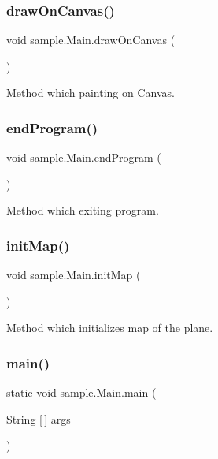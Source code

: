 \subsubsection{\texorpdfstring{draw\+On\+Canvas()}{drawOnCanvas()}}
{\footnotesize\ttfamily void sample.\+Main.\+draw\+On\+Canvas (\begin{DoxyParamCaption}{ }\end{DoxyParamCaption})}

Method which painting on Canvas. \mbox{\label{classsample_1_1_main_afb2b026a5f80dedc650f7edca34200bb}} 
\subsubsection{\texorpdfstring{end\+Program()}{endProgram()}}
{\footnotesize\ttfamily void sample.\+Main.\+end\+Program (\begin{DoxyParamCaption}{ }\end{DoxyParamCaption})}

Method which exiting program. \mbox{\label{classsample_1_1_main_aaefc601de8d34a33e916f6187c793b29}} 
\subsubsection{\texorpdfstring{init\+Map()}{initMap()}}
{\footnotesize\ttfamily void sample.\+Main.\+init\+Map (\begin{DoxyParamCaption}{ }\end{DoxyParamCaption})}

Method which initializes map of the plane. \mbox{\label{classsample_1_1_main_ab70e98057c0f40b833a38ea10a74eceb}} 
\subsubsection{\texorpdfstring{main()}{main()}}
{\footnotesize\ttfamily static void sample.\+Main.\+main (\begin{DoxyParamCaption}\item[{String \mbox{[}$\,$\mbox{]}}]{args }\end{DoxyParamCaption})\hspace{0.3cm}{\ttfamily [static]}}

